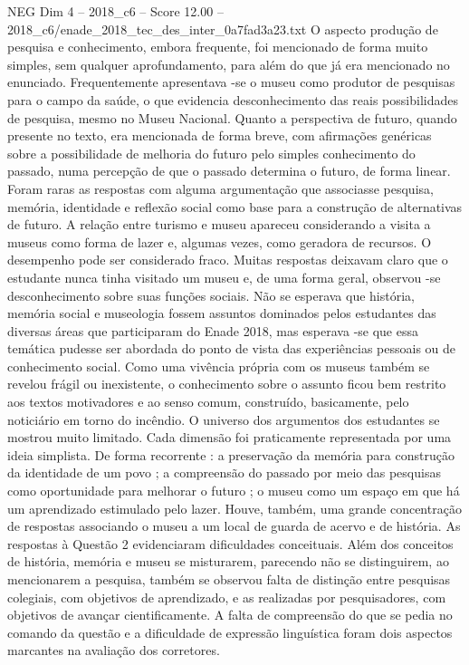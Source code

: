 \begin{textsample}{NEG Dim 4 – 2018\_c6 – Score 12.00 – 2018\_c6/enade\_2018\_tec\_des\_inter\_0a7fad3a23.txt}
O aspecto produção de pesquisa e conhecimento, embora frequente, foi mencionado de forma muito simples, sem qualquer aprofundamento, para além do que já era mencionado no enunciado.
Frequentemente apresentava -se o museu como produtor de pesquisas para o campo da saúde, o que evidencia desconhecimento das reais possibilidades de pesquisa, mesmo no Museu Nacional.
Quanto a perspectiva de futuro, quando presente no texto, era mencionada de forma breve, com afirmações genéricas sobre a possibilidade de melhoria do futuro pelo simples conhecimento do passado, numa percepção de que o passado determina o futuro, de forma linear.
Foram raras as respostas com alguma argumentação que associasse pesquisa, memória, identidade e reflexão social como base para a construção de alternativas de futuro.
A relação entre turismo e museu apareceu considerando a visita a museus como forma de lazer e, algumas vezes, como geradora de recursos.
O desempenho pode ser considerado fraco.
Muitas respostas deixavam claro que o estudante nunca tinha visitado um museu e, de uma forma geral, observou -se desconhecimento sobre suas funções sociais.
Não se esperava que história, memória social e museologia fossem assuntos dominados pelos estudantes das diversas áreas que participaram do Enade 2018, mas esperava -se que essa temática pudesse ser abordada do ponto de vista das experiências pessoais ou de conhecimento social.
Como uma vivência própria com os museus também se revelou frágil ou inexistente, o conhecimento sobre o assunto ficou bem restrito aos textos motivadores e ao senso comum, construído, basicamente, pelo noticiário em torno do incêndio.
O universo dos argumentos dos estudantes se mostrou muito limitado.
Cada dimensão foi praticamente representada por uma ideia simplista.
De forma recorrente : a preservação da memória para construção da identidade de um povo ; a compreensão do passado por meio das pesquisas como oportunidade para melhorar o futuro ; o museu como um espaço em que há um aprendizado estimulado pelo lazer.
Houve, também, uma grande concentração de respostas associando o museu a um local de guarda de acervo e de história.
As respostas à Questão 2 evidenciaram dificuldades conceituais.
Além dos conceitos de história, memória e museu se misturarem, parecendo não se distinguirem, ao mencionarem a pesquisa, também se observou falta de distinção entre pesquisas colegiais, com objetivos de aprendizado, e as realizadas por pesquisadores, com objetivos de avançar cientificamente.
A falta de compreensão do que se pedia no comando da questão e a dificuldade de expressão linguística foram dois aspectos marcantes na avaliação dos corretores.

\end{textsample}

